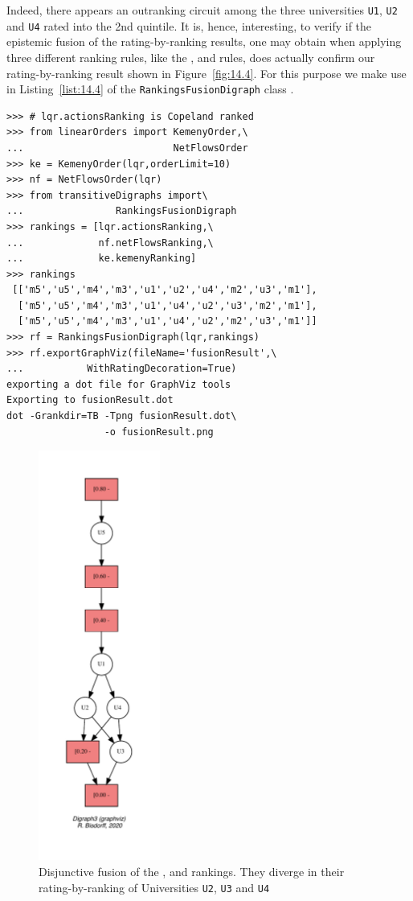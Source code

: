 Indeed, there appears an outranking circuit among the three universities \texttt{U1}, \texttt{U2} and \texttt{U4} rated into the 2nd quintile. It is, hence, interesting, to verify if the epistemic fusion of the rating-by-ranking results, one may obtain when applying three different ranking rules, like the \Kemeny, \Copeland and \NetFlows rules, does actually confirm our rating-by-ranking result shown in Figure~\vref{fig:14.4}. For this purpose we make use in Listing~\vref{list:14.4} of the \texttt{RankingsFusionDigraph} class .
\begin{lstlisting}[caption={Computing the epistemic fusion of two rating-by-rankig results},label=list:14.4]
>>> # lqr.actionsRanking is Copeland ranked
>>> from linearOrders import KemenyOrder,\
...                          NetFlowsOrder
>>> ke = KemenyOrder(lqr,orderLimit=10)
>>> nf = NetFlowsOrder(lqr)
>>> from transitiveDigraphs import\
...                RankingsFusionDigraph
>>> rankings = [lqr.actionsRanking,\
...             nf.netFlowsRanking,\
...             ke.kemenyRanking]
>>> rankings
 [['m5','u5','m4','m3','u1','u2','u4','m2','u3','m1'],
  ['m5','u5','m4','m3','u1','u4','u2','u3','m2','m1'],
  ['m5','u5','m4','m3','u1','u4','u2','m2','u3','m1']]
>>> rf = RankingsFusionDigraph(lqr,rankings)
>>> rf.exportGraphViz(fileName='fusionResult',\
...           WithRatingDecoration=True)
exporting a dot file for GraphViz tools
Exporting to fusionResult.dot
dot -Grankdir=TB -Tpng fusionResult.dot\
                 -o fusionResult.png
\end{lstlisting}
\begin{figure}[ht]
\sidecaption[t]
\includegraphics[width=4cm]{Figures/14-5-fusionResult.pdf}
\caption[Disjunctive fusion of the \Kemeny, \Copeland and \NetFlows rankings]{Disjunctive fusion of the \Kemeny, \Copeland and \NetFlows rankings. They diverge in their rating-by-ranking of Universities \texttt{U2}, \texttt{U3} and \texttt{U4}}
\label{fig:14.5}       %
\end{figure}

